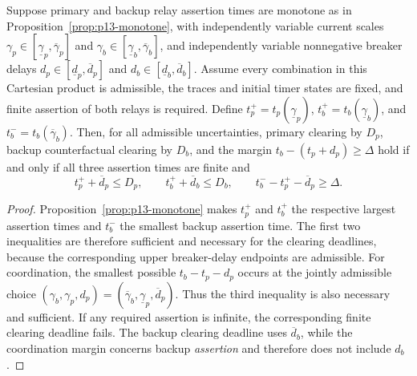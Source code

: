 \begin{theorem}
\label{thm:p13-rectangle}
Suppose primary and backup relay assertion times are monotone as in Proposition~\ref{prop:p13-monotone}, with independently variable current scales
\(\gamma_p\in[\underline\gamma_p,\overline\gamma_p]\) and
\(\gamma_b\in[\underline\gamma_b,\overline\gamma_b]\), and independently variable nonnegative breaker delays \(d_p\in[\underline d_p,\overline d_p]\) and \(d_b\in[\underline d_b,\overline d_b]\). Assume every combination in this Cartesian product is admissible, the traces and initial timer states are fixed, and finite assertion of both relays is required. Define
\(t_p^+=t_p(\underline\gamma_p)\),
\(t_b^+=t_b(\underline\gamma_b)\), and
\(t_b^-=t_b(\overline\gamma_b)\).
Then, for all admissible uncertainties, primary clearing by \(D_p\), backup counterfactual clearing by \(D_b\), and the margin
\(t_b-(t_p+d_p)\ge\Delta\)
hold if and only if all three assertion times are finite and
\[
t_p^++\overline d_p\le D_p,\qquad
t_b^++\overline d_b\le D_b,\qquad
t_b^--t_p^+-\overline d_p\ge\Delta.
\]
\end{theorem}
\begin{proof}
Proposition~\ref{prop:p13-monotone} makes \(t_p^+\) and \(t_b^+\) the respective largest assertion times and \(t_b^-\) the smallest backup assertion time. The first two inequalities are therefore sufficient and necessary for the clearing deadlines, because the corresponding upper breaker-delay endpoints are admissible. For coordination, the smallest possible \(t_b-t_p-d_p\) occurs at the jointly admissible choice \((\gamma_b,\gamma_p,d_p)=(\overline\gamma_b,\underline\gamma_p,\overline d_p)\). Thus the third inequality is also necessary and sufficient. If any required assertion is infinite, the corresponding finite clearing deadline fails. The backup clearing deadline uses \(\overline d_b\), while the coordination margin concerns backup \emph{assertion} and therefore does not include \(d_b\).
\end{proof}

